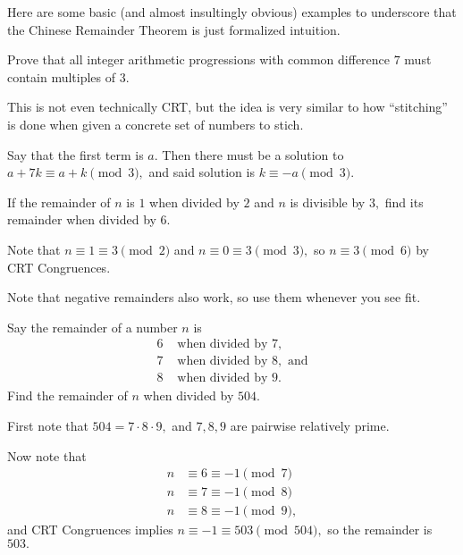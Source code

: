 \documentclass[mast]{lucky}
\begin{document}
Here are some basic (and almost insultingly obvious) examples to underscore that the Chinese Remainder Theorem is just formalized intuition.

\begin{exam}
Prove that all integer arithmetic progressions with common difference $7$ must contain multiples of $3.$
\end{exam}

This is not even technically CRT, but the idea is very similar to how ``stitching'' is done when given a concrete set of numbers to stich.

\begin{sol}
Say that the first term is $a.$ Then there must be a solution to $a+7k\equiv a+k\pmod{3},$ and said solution is $k\equiv -a\pmod{3}.$
\end{sol}

\begin{exam}
If the remainder of $n$ is $1$ when divided by $2$ and $n$ is divisible by $3,$ find its remainder when divided by $6.$
\end{exam}

\begin{sol}
Note that $n\equiv 1\equiv 3\pmod{2}$ and $n\equiv 0\equiv 3\pmod{3},$ so $n\equiv3\pmod{6}$ by CRT Congruences.
\end{sol}

Note that negative remainders also work, so use them whenever you see fit.

\begin{exam}
Say the remainder of a number $n$ is
\begin{align*}
6 &\text{ when divided by } 7, \\
7 &\text{ when divided by } 8, \text{ and}\\
8 &\text{ when divided by } 9.
\end{align*}
Find the remainder of $n$ when divided by $504.$
\end{exam}

\begin{sol}
First note that $504=7\cdot 8\cdot 9,$ and $7,8,9$ are pairwise relatively prime.

Now note that
\begin{align*}
n&\equiv 6\equiv -1\pmod{7} \\
n&\equiv 7\equiv -1\pmod{8} \\
n&\equiv 8\equiv -1\pmod{9},
\end{align*}
and CRT Congruences implies $n\equiv -1\equiv 503\pmod{504},$ so the remainder is $503.$
\end{sol}
\end{document}
